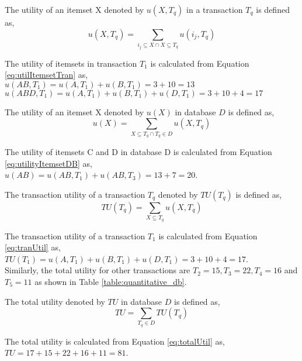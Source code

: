 \documentclass[11pt,openright]{report}
\begin{document}
\begin{definition}
	The utility of an itemset X denoted by $u(X, T_q)$ in a transaction $T_q$ is defined as,
	\begin{equation}
	u(X, T_q) = \sum_{i_j \subseteq X \cap X \subseteq T_q} u(i_j, T_q) \label{eq:utilItemsetTran}
	\end{equation}
\end{definition}
 The utility of itemsets in transaction $T_1$ is calculated from Equation \ref{eq:utilItemsetTran} as,\\ 
\indent $u(AB,T_1) = u(A,T_1) + u(B,T_1) = 3 + 10 = 13$ \\
\indent $u(ABD,T_1) = u(A,T_1) + u(B,T_1) + u(D,T_1) = 3 + 10 + 4= 17$ 

\begin{definition}
	The utility of an itemset X denoted by $u(X)$ in database $D$ is defined as,
	\begin{equation}
	u(X) = \sum_{X \subseteq T_q \cap T_q \in D} u(X, T_q) \label{eq:utilityItemsetDB}
	\end{equation}
\end{definition}
The utility of itemsets C and D in database D is calculated from Equation \ref{eq:utilityItemsetDB} as, \\
\indent $u(AB) = u(AB,T_1) + u(AB,T_3) = 13 + 7 = 20$.

\begin{definition}
	The transaction utility of a transaction $T_q$ denoted by $TU(T_q)$ is defined as,
	\begin{equation}
	TU(T_q) = \sum_{X \subseteq T_q} u(X, T_q) \label{eq:tranUtil}
	\end{equation}
\end{definition}
The transaction utility of a transaction $T_1$ is calculated from Equation \ref{eq:tranUtil} as,\\
\indent$TU(T_1) = u(A,T_1) + u(B,T_1) + u(D,T_1) = 3 + 10 + 4 = 17$.\\
Similarly, the total utility for other transactions are $T_2 = 15, T_3 = 22, T_4 = 16$ and $T_5 = 11$ as shown in Table \ref{table:quantitative_db}.

\begin{definition}
	The total utility denoted by $TU$ in database $D$ is defined as,
	\begin{equation}
	TU = \sum_{T_q \in D} TU(T_q) \label{eq:totalUtil}
	\end{equation}
\end{definition}
 The total utility is calculated from Equation \ref{eq:totalUtil} as,\\
 \indent $TU = 17 + 15 + 22 + 16 + 11 = 81$.
\end{document}
